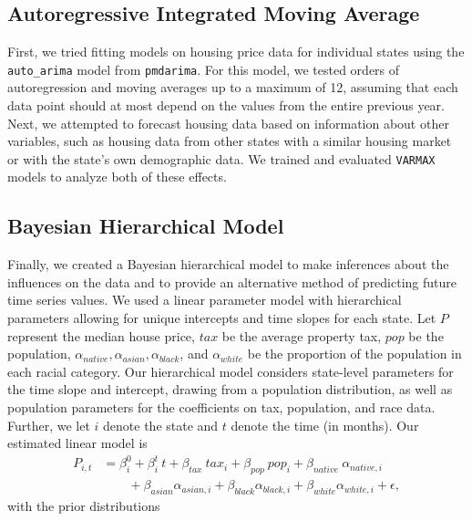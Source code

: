 \documentclass[11pt]{amsart}
\begin{document}
\subsection{Autoregressive Integrated Moving Average}
First, we tried fitting models on housing price data for individual states using the \texttt{auto\_arima} model from \texttt{pmdarima}.
For this model, we tested orders of autoregression and moving averages up to a maximum of 12, assuming that each data point should at most depend on the values from the entire previous year.
Next, we attempted to forecast housing data based on information about other variables, such as housing data from other states with a similar housing market or with the state's own demographic data. We trained and evaluated \texttt{VARMAX} models to analyze both of these effects.

\subsection{Bayesian Hierarchical Model}
Finally, we created a Bayesian hierarchical model to make inferences about the influences on the data and to provide an alternative method of predicting future time series values.
We used a linear parameter model with hierarchical parameters allowing for unique intercepts and time slopes for each state.
Let $P$ represent the median house price, $tax$ be the average property tax, $pop$ be the population, $\alpha_{native}, \alpha_{asian}, \alpha_{black}$, and $\alpha_{white}$ be the proportion of the population in each racial category.
Our hierarchical model considers state-level parameters for the time slope and intercept, drawing from a population distribution, as well as population parameters for the coefficients on tax, population, and race data.
Further, we let $i$ denote the state and $t$ denote the time (in months).
Our estimated linear model is
\begin{align*}
    P_{i, t} &= \beta_i^0 + \beta_i^t \ t + \beta_{tax}\ tax_i + \beta_{pop}\ pop_i + \beta_{native}\ \alpha_{native, i}  \\
    & \qquad + \beta_{asian} \alpha_{asian, i} + \beta_{black}\alpha_{black, i} + \beta_{white} \alpha_{white, i} + \epsilon, 
\end{align*}
with the prior distributions
\end{document}
